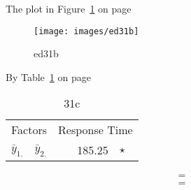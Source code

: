 

%
%

The plot in Figure~\ref{fi:ed31b} on page~\pageref{fi:ed31b}
 \begin{figure}[hbtp]
\begin{center}
\texttt{[image: images/ed31b]}
\caption{ed31b }
\label{fi:ed31b}
\end{center}
 \end{figure}

By Table~\ref{tab:31c} on page~\pageref{tab:31c}
 \begin{table}[hbtp]
\begin{center}
\caption{31c}
\label{tab:31c}
\begin{tabular}{l @{-} l @{=} r l}
\hline
\multicolumn{2}{c|}{Factors} & \multicolumn{2}{c}{Response Time} \\
$\bar{y}_{1.}$ & $\bar{y}_{2.}$ & 185.25 & $\star$ \\
\hline
\end{tabular}
\end{center}
 \end{table}

\begin{eqnarray}
    & = &
\nonumber\\ %
    & = &
\nonumber
\end{eqnarray}

\begin{description}
   \item[]
\end{description}
